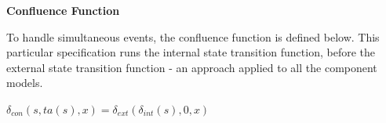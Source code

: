 \documentclass[10pt]{article}
\begin{document}
\textbf{Confluence Function}

To handle simultaneous events, the confluence function is defined below.  This particular specification runs the internal state transition function, before the external state transition function - an approach applied to all the component models.

\begin{center}
  $\delta_{con}(s,ta(s),x)=\delta_{ext}(\delta_{int}(s),0,x)$ \\
\end{center}








\end{document}
